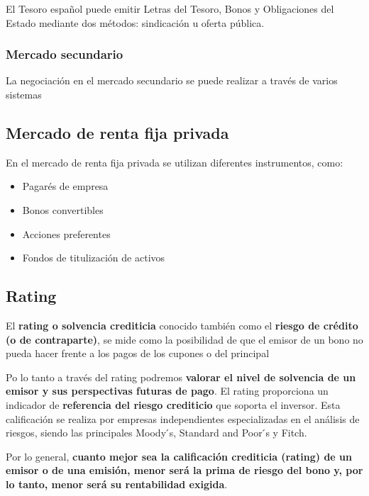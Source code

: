 \documentclass[
  letterpaper,
  DIV=11,
  numbers=noendperiod]{scrreprt}
\providecommand{\tightlist}{%
  \setlength{\itemsep}{0pt}\setlength{\parskip}{0pt}}\usepackage{longtable,booktabs,array}
\begin{document}
\begin{tcolorbox}
El Tesoro español puede emitir Letras del Tesoro, Bonos y Obligaciones
del Estado mediante dos métodos: sindicación u oferta pública.

\subsubsection{Mercado secundario}\label{mercado-secundario}

La negociación en el mercado secundario se puede realizar a través de
varios sistemas

\subsection{Mercado de renta fija
privada}\label{mercado-de-renta-fija-privada}

En el mercado de renta fija privada se utilizan diferentes instrumentos,
como:

\begin{itemize}
\tightlist
\item
  Pagarés de empresa
\item
  Bonos convertibles
\item
  Acciones preferentes
\item
  Fondos de titulización de activos
\end{itemize}

\subsection{Rating}\label{rating}

El \textbf{rating o solvencia crediticia} conocido también como el
\textbf{riesgo de crédito (o de contraparte)}, se mide como la
posibilidad de que el emisor de un bono no pueda hacer frente a los
pagos de los cupones o del principal

Po lo tanto a través del rating podremos \textbf{valorar el nivel de
solvencia de un emisor y sus perspectivas futuras de pago}. El rating
proporciona un indicador de \textbf{referencia del riesgo crediticio}
que soporta el inversor. Esta calificación se realiza por empresas
independientes especializadas en el análisis de riesgos, siendo las
principales Moody ́s, Standard and Poor ́s y Fitch.

Por lo general, \textbf{cuanto mejor sea la calificación crediticia
(rating) de un emisor o de una emisión, menor será la prima de riesgo
del bono y, por lo tanto, menor será su rentabilidad exigida}.


\end{tcolorbox}
\end{document}
